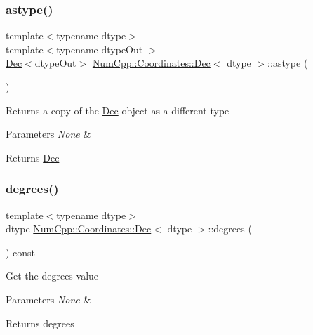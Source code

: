 \subsubsection{\texorpdfstring{astype()}{astype()}}
{\footnotesize\ttfamily template$<$typename dtype$>$ \\
template$<$typename dtype\+Out $>$ \\
\mbox{\hyperlink{class_num_cpp_1_1_coordinates_1_1_dec}{Dec}}$<$dtype\+Out$>$ \mbox{\hyperlink{class_num_cpp_1_1_coordinates_1_1_dec}{Num\+Cpp\+::\+Coordinates\+::\+Dec}}$<$ dtype $>$\+::astype (\begin{DoxyParamCaption}{ }\end{DoxyParamCaption})\hspace{0.3cm}{\ttfamily [inline]}}

Returns a copy of the \mbox{\hyperlink{class_num_cpp_1_1_coordinates_1_1_dec}{Dec}} object as a different type


\begin{DoxyParams}{Parameters}
{\em None} & \\
\hline
\end{DoxyParams}
\begin{DoxyReturn}{Returns}
\mbox{\hyperlink{class_num_cpp_1_1_coordinates_1_1_dec}{Dec}} 
\end{DoxyReturn}
\mbox{\label{class_num_cpp_1_1_coordinates_1_1_dec_a6529988c999d74ce3f59b1479135f9f4}} 
\subsubsection{\texorpdfstring{degrees()}{degrees()}}
{\footnotesize\ttfamily template$<$typename dtype$>$ \\
dtype \mbox{\hyperlink{class_num_cpp_1_1_coordinates_1_1_dec}{Num\+Cpp\+::\+Coordinates\+::\+Dec}}$<$ dtype $>$\+::degrees (\begin{DoxyParamCaption}{ }\end{DoxyParamCaption}) const\hspace{0.3cm}{\ttfamily [inline]}}

Get the degrees value


\begin{DoxyParams}{Parameters}
{\em None} & \\
\hline
\end{DoxyParams}
\begin{DoxyReturn}{Returns}
degrees 
\end{DoxyReturn}
\mbox{\label{class_num_cpp_1_1_coordinates_1_1_dec_a83b278f99a2774571bbc635a22fd1097}} 
